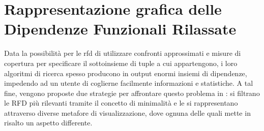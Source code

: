 \chapter{Rappresentazione grafica delle Dipendenze Funzionali Rilassate}
\label{cap4:visual_representation}

Data la possibilit\`{a} per le \acrshort{rfd} di utilizzare confronti approssimati e misure di copertura per specificare il sottoinsieme di tuple a cui appartengono, i loro algoritmi di ricerca spesso producono in output enormi insiemi di dipendenze, impedendo ad un utente di coglierne facilmente informazioni e statistiche. A tal fine, vengono proposte due strategie per affrontare questo problema in \cite{mdvisualization}: si filtrano le RFD pi\`{u} rilevanti tramite il concetto di minimalit\`{a} e le si rappresentano attraverso diverse metafore di visualizzazione, dove ognuna delle quali mette in risalto un aspetto differente.

